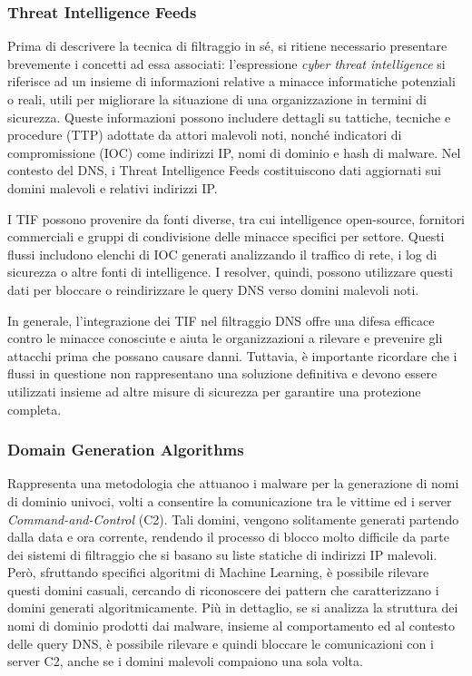\subsubsection{Threat Intelligence Feeds}
Prima di descrivere la tecnica di filtraggio in sé, si ritiene necessario presentare brevemente i concetti ad essa associati: l'espressione \textit{cyber threat intelligence} si riferisce ad un insieme di informazioni relative a minacce informatiche potenziali o reali, utili per migliorare la situazione di una organizzazione in termini di sicurezza.
%
Queste informazioni possono includere dettagli su tattiche, tecniche e procedure (TTP) adottate da attori malevoli noti, nonché indicatori di compromissione (IOC) come indirizzi IP, nomi di dominio e hash di malware. Nel contesto del DNS, i Threat Intelligence Feeds costituiscono dati aggiornati sui domini malevoli e relativi indirizzi IP.

I TIF possono provenire da fonti diverse, tra cui intelligence open-source, fornitori commerciali e gruppi di condivisione delle minacce specifici per settore. Questi flussi includono elenchi di IOC generati analizzando il traffico di rete, i log di sicurezza o altre fonti di intelligence. I resolver, quindi, possono utilizzare questi dati per bloccare o reindirizzare le query DNS verso domini malevoli noti.

In generale, l'integrazione dei TIF nel filtraggio DNS offre una difesa efficace contro le minacce conosciute e aiuta le organizzazioni a rilevare e prevenire gli attacchi prima che possano causare danni. Tuttavia, è importante ricordare che i flussi in questione non rappresentano una soluzione definitiva e devono essere utilizzati insieme ad altre misure di sicurezza per garantire una protezione completa.

\subsubsection{Domain Generation Algorithms}
Rappresenta una metodologia che attuanoo i malware per la generazione di nomi di dominio univoci, volti a consentire la comunicazione tra le vittime ed i server \textit{Command-and-Control} (C2). Tali domini, vengono solitamente generati partendo dalla data e ora corrente, rendendo il processo di blocco molto difficile da parte dei sistemi di filtraggio che si basano su liste statiche di indirizzi IP malevoli. Però, sfruttando specifici algoritmi di Machine Learning, è possibile rilevare questi domini casuali, cercando di riconoscere dei pattern che caratterizzano i domini generati algoritmicamente. Più in dettaglio, se si analizza la struttura dei nomi di dominio prodotti dai malware, insieme al comportamento ed al contesto delle query DNS, è possibile rilevare e quindi bloccare le comunicazioni con i server C2, anche se i domini malevoli compaiono una sola volta.

